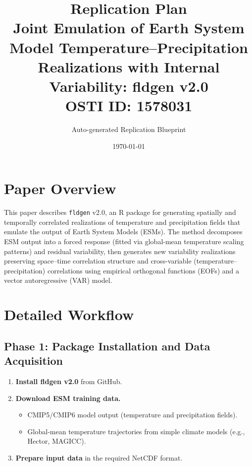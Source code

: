\documentclass[11pt,a4paper]{article}
\title{\textbf{Replication Plan}\\[0.5em]
\large Joint Emulation of Earth System Model Temperature--Precipitation Realizations with Internal Variability: fldgen v2.0\\[0.3em]
\normalsize OSTI ID: 1578031}
\author{Auto-generated Replication Blueprint}
\date{\today}
\begin{document}
\maketitle
\tableofcontents
\newpage

\section{Paper Overview}
This paper describes \texttt{fldgen} v2.0, an R package for generating spatially and temporally correlated realizations of temperature and precipitation fields that emulate the output of Earth System Models (ESMs). The method decomposes ESM output into a forced response (fitted via global-mean temperature scaling patterns) and residual variability, then generates new variability realizations preserving space--time correlation structure and cross-variable (temperature--precipitation) correlations using empirical orthogonal functions (EOFs) and a vector autoregressive (VAR) model.

\section{Detailed Workflow}

\subsection{Phase 1: Package Installation and Data Acquisition}
\begin{enumerate}[label=\textbf{1.\arabic*}]
  \item \textbf{Install fldgen v2.0} from GitHub.
  \item \textbf{Download ESM training data.}
    \begin{itemize}
      \item CMIP5/CMIP6 model output (temperature and precipitation fields).
      \item Global-mean temperature trajectories from simple climate models (e.g., Hector, MAGICC).
    \end{itemize}
  \item \textbf{Prepare input data} in the required NetCDF format.
\end{enumerate}
\end{document}

